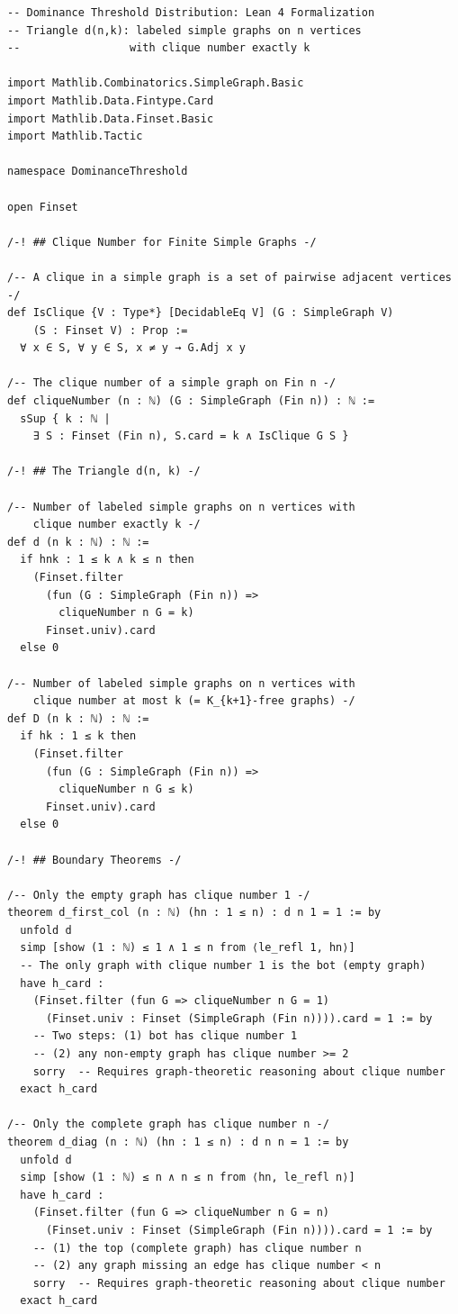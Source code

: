 \documentclass[11pt,a4paper]{article}
\theoremstyle{definition}
\begin{document}
\begin{lstlisting}[style=lean, caption={Lean 4 formalization of the Dominance Threshold Distribution}]
-- Dominance Threshold Distribution: Lean 4 Formalization
-- Triangle d(n,k): labeled simple graphs on n vertices
--                 with clique number exactly k

import Mathlib.Combinatorics.SimpleGraph.Basic
import Mathlib.Data.Fintype.Card
import Mathlib.Data.Finset.Basic
import Mathlib.Tactic

namespace DominanceThreshold

open Finset

/-! ## Clique Number for Finite Simple Graphs -/

/-- A clique in a simple graph is a set of pairwise adjacent vertices -/
def IsClique {V : Type*} [DecidableEq V] (G : SimpleGraph V)
    (S : Finset V) : Prop :=
  ∀ x ∈ S, ∀ y ∈ S, x ≠ y → G.Adj x y

/-- The clique number of a simple graph on Fin n -/
def cliqueNumber (n : ℕ) (G : SimpleGraph (Fin n)) : ℕ :=
  sSup { k : ℕ |
    ∃ S : Finset (Fin n), S.card = k ∧ IsClique G S }

/-! ## The Triangle d(n, k) -/

/-- Number of labeled simple graphs on n vertices with
    clique number exactly k -/
def d (n k : ℕ) : ℕ :=
  if hnk : 1 ≤ k ∧ k ≤ n then
    (Finset.filter
      (fun (G : SimpleGraph (Fin n)) =>
        cliqueNumber n G = k)
      Finset.univ).card
  else 0

/-- Number of labeled simple graphs on n vertices with
    clique number at most k (= K_{k+1}-free graphs) -/
def D (n k : ℕ) : ℕ :=
  if hk : 1 ≤ k then
    (Finset.filter
      (fun (G : SimpleGraph (Fin n)) =>
        cliqueNumber n G ≤ k)
      Finset.univ).card
  else 0

/-! ## Boundary Theorems -/

/-- Only the empty graph has clique number 1 -/
theorem d_first_col (n : ℕ) (hn : 1 ≤ n) : d n 1 = 1 := by
  unfold d
  simp [show (1 : ℕ) ≤ 1 ∧ 1 ≤ n from ⟨le_refl 1, hn⟩]
  -- The only graph with clique number 1 is the bot (empty graph)
  have h_card :
    (Finset.filter (fun G => cliqueNumber n G = 1)
      (Finset.univ : Finset (SimpleGraph (Fin n)))).card = 1 := by
    -- Two steps: (1) bot has clique number 1
    -- (2) any non-empty graph has clique number >= 2
    sorry  -- Requires graph-theoretic reasoning about clique number
  exact h_card

/-- Only the complete graph has clique number n -/
theorem d_diag (n : ℕ) (hn : 1 ≤ n) : d n n = 1 := by
  unfold d
  simp [show (1 : ℕ) ≤ n ∧ n ≤ n from ⟨hn, le_refl n⟩]
  have h_card :
    (Finset.filter (fun G => cliqueNumber n G = n)
      (Finset.univ : Finset (SimpleGraph (Fin n)))).card = 1 := by
    -- (1) the top (complete graph) has clique number n
    -- (2) any graph missing an edge has clique number < n
    sorry  -- Requires graph-theoretic reasoning about clique number
  exact h_card


\end{lstlisting}
\end{document}
